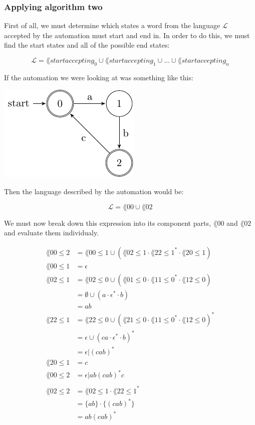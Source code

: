 \subsubsection{Applying algorithm two}

First of all, we must determine which states a word from the language
$\mathcal{L}$ accepted by the automation must start and end in. In order to do
this, we must find the start states and all of the possible end states:

\[
	\mathcal{L} = \lang{start}{accepting_0}{} \cup
		\lang{start}{accepting_1}{} \cup \dots \cup \lang{start}{accepting_n}{}
\]

If the automation we were looking at was something like this:


\begin{center}
  \includegraphics{automata/11.pdf}
\end{center}

Then the language described by the automation would be:

\[
	\mathcal{L} = \lang{0}{0}{} \cup \lang{0}{2}{}
\]

We must now break down this expression into its component parts, $\lang{0}{0}{}$
and $\lang{0}{2}{}$ and evaluate them individualy.

\[
	\begin{split}
		\lang{0}{0}{\leq 2} &= \lang{0}{0}{\leq 1} \cup \left( \lang{0}{2}{\leq 1} \cdot {\lang{2}{2}{\leq 1}}^{*} \cdot \lang{2}{0}{\leq 1} \right)\\
		\lang{0}{0}{\leq 1} &= \epsilon\\
		\lang{0}{2}{\leq 1} &= \lang{0}{2}{\leq 0} \cup \left( \lang{0}{1}{\leq 0} \cdot {\lang{1}{1}{\leq 0}}^{*} \cdot \lang{1}{2}{\leq 0} \right)\\
							&= \emptyset \cup \left( a \cdot \epsilon^*  \cdot b \right)\\
							&= ab\\
		\lang{2}{2}{\leq 1} &= \lang{2}{2}{\leq 0} \cup \left( \lang{2}{1}{\leq 0} \cdot {\lang{1}{1}{\leq 0}}^{*} \cdot \lang{1}{2}{\leq 0} \right)^*\\
							&= \epsilon \cup \left( ca \cdot \epsilon^* \cdot b \right)^*\\
							&= \epsilon | (cab)^*\\
		\lang{2}{0}{\leq 1} &= c\\
		\lang{0}{0}{\leq 2} &= \epsilon | ab(cab)^*c\\\\
		\lang{0}{2}{\leq 2} &= \lang{0}{2}{\leq 1} \cdot {\lang{2}{2}{\leq 1}}^*\\
							&= \{ab\} \cdot \{(cab)^*\}\\
							&= ab(cab)^*\\
	\end{split}
\]


